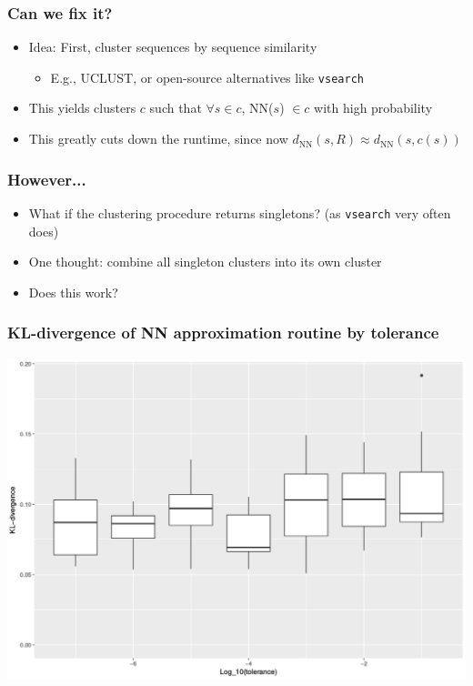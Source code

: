 \documentclass[mathserif,compress]{beamer}
\renewcommand\;{\,}
\begin{document}
\begin{frame}\frametitle{Can we fix it?}
\begin{itemize}
\item
Idea: First, cluster sequences by sequence similarity
\begin{itemize}
\smallskip
\item E.g., UCLUST, or open-source alternatives like \texttt{vsearch}
\end{itemize}
\bigskip
\item
This yields clusters $c$ such that $\forall s \in c$, NN($s$) $\in c$ with high probability
\bigskip
\item
This greatly cuts down the runtime, since now $d_\text{NN}(s, R) \approx d_\text{NN}(s, c(s))$
\end{itemize}
\end{frame}

\begin{frame}\frametitle{However...}
\begin{itemize}
\item
What if the clustering procedure returns singletons? (as \texttt{vsearch} very often does)
\bigskip
\item
One thought: combine all singleton clusters into its own cluster
\bigskip
\item
Does this work?
\end{itemize}
\end{frame}

\begin{frame}\frametitle{KL-divergence of NN approximation routine by tolerance}
\begin{center}
\includegraphics[width=\linewidth]{Images/div_by_tol_nn.png}
\end{center}
\end{frame}
\end{document}
